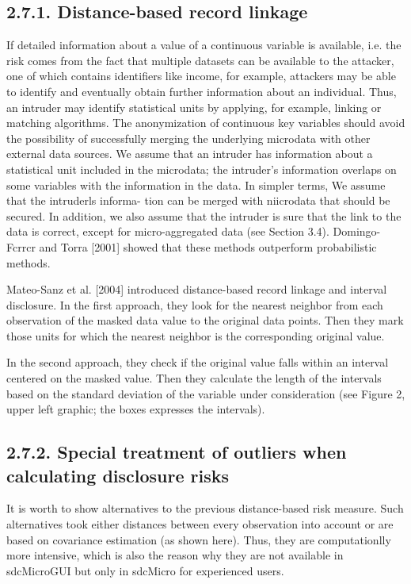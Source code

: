 \subsection*{2.7.1. Distance-based record linkage}
If detailed information about a value of a continuous variable is available, i.e. the
risk comes from the fact that multiple datasets can be available to the attacker,
one of which contains identiﬁers like income, for example, attackers may be able
to identify and eventually obtain further information about an individual. Thus,
an intruder may identify statistical units by applying, for example, linking or
matching algorithms. The anonymization of continuous key variables should avoid
the possibility of successfully merging the underlying microdata with other external
data sources.
We assume that an intruder has information about a statistical unit included
in the microdata; the intruder’s information overlaps on some variables with the
information in the data. In simpler terms, We assume that the intruderls informa-
tion can be merged with niicrodata that should be secured. In addition, we also
assume that the intruder is sure that the link to the data is correct, except for
micro-aggregated data (see Section 3.4). Domingo-Fcrrcr and Torra [2001] showed
that these methods outperform probabilistic methods.

Mateo-Sanz et al. [2004] introduced distance-based record linkage and interval
disclosure. In the ﬁrst approach, they look for the nearest neighbor from each
observation of the masked data value to the original data points. Then they mark
those units for which the nearest neighbor is the corresponding original value.

In the second approach, they check if the original value falls within an interval
centered on the masked value. Then they calculate the length of the intervals
based on the standard deviation of the variable under consideration (see Figure 2,
upper left graphic; the boxes expresses the intervals).
\subsection*{2.7.2. Special treatment of outliers when calculating disclosure risks}

It is worth to show alternatives to the previous distance-based risk measure. Such
alternatives took either distances between every observation into account or are
based on covariance estimation (as shown here). Thus, they are computationlly
more intensive, which is also the reason why they are not available in sdcMicroGUI
but only in sdcMicro for experienced users.

